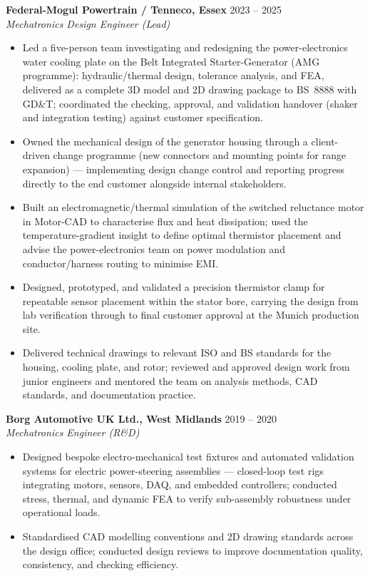 \noindent\textbf{Federal-Mogul Powertrain / Tenneco, Essex} \hfill 2023 -- 2025\\
\textit{Mechatronics Design Engineer (Lead)}
\begin{itemize}
  \item Led a five-person team investigating and redesigning the power-electronics water cooling plate on the Belt Integrated Starter-Generator (AMG programme): hydraulic/thermal design, tolerance analysis, and FEA, delivered as a complete 3D model and 2D drawing package to BS~8888 with GD\&T; coordinated the checking, approval, and validation handover (shaker and integration testing) against customer specification.
  \item Owned the mechanical design of the generator housing through a client-driven change programme (new connectors and mounting points for range expansion) --- implementing design change control and reporting progress directly to the end customer alongside internal stakeholders.
  \item Built an electromagnetic/thermal simulation of the switched reluctance motor in Motor-CAD to characterise flux and heat dissipation; used the temperature-gradient insight to define optimal thermistor placement and advise the power-electronics team on power modulation and conductor/harness routing to minimise EMI.
  \item Designed, prototyped, and validated a precision thermistor clamp for repeatable sensor placement within the stator bore, carrying the design from lab verification through to final customer approval at the Munich production site.
  \item Delivered technical drawings to relevant ISO and BS standards for the housing, cooling plate, and rotor; reviewed and approved design work from junior engineers and mentored the team on analysis methods, CAD standards, and documentation practice.
\end{itemize}

\noindent\textbf{Borg Automotive UK Ltd., West Midlands} \hfill 2019 -- 2020\\
\textit{Mechatronics Engineer (R\&D)}
\begin{itemize}
  \item Designed bespoke electro-mechanical test fixtures and automated validation systems for electric power-steering assemblies --- closed-loop test rigs integrating motors, sensors, DAQ, and embedded controllers; conducted stress, thermal, and dynamic FEA to verify sub-assembly robustness under operational loads.
  \item Standardised CAD modelling conventions and 2D drawing standards across the design office; conducted design reviews to improve documentation quality, consistency, and checking efficiency.
\end{itemize}

